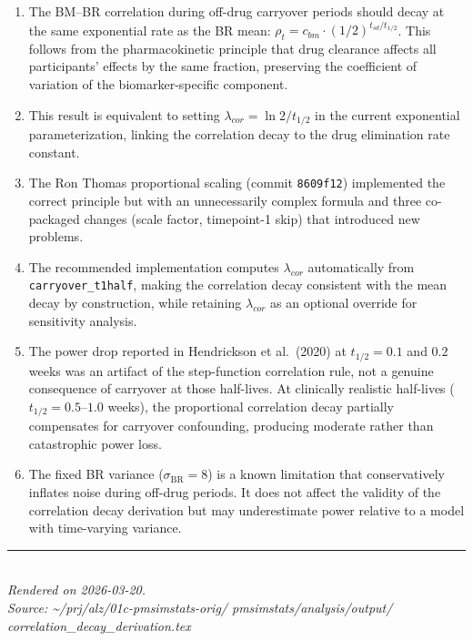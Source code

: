 \documentclass[11pt]{article}
\begin{document}
\begin{enumerate}
\item The BM--BR correlation during off-drug carryover
  periods should decay at the same exponential rate as the
  BR mean: $\rho_t = c_{bm} \cdot (1/2)^{t_{sd}/t_{1/2}}$.
  This follows from the pharmacokinetic principle that drug
  clearance affects all participants' effects by the same
  fraction, preserving the coefficient of variation of the
  biomarker-specific component.

\item This result is equivalent to setting
  $\lambda_{cor} = \ln 2 / t_{1/2}$ in the current
  exponential parameterization, linking the correlation
  decay to the drug elimination rate constant.

\item The Ron Thomas proportional scaling (commit
  \texttt{8609f12}) implemented the correct principle but
  with an unnecessarily complex formula and three
  co-packaged changes (scale factor, timepoint-1 skip)
  that introduced new problems.

\item The recommended implementation computes
  $\lambda_{cor}$ automatically from
  \texttt{carryover\_t1half}, making the correlation decay
  consistent with the mean decay by construction, while
  retaining $\lambda_{cor}$ as an optional override for
  sensitivity analysis.

\item The power drop reported in Hendrickson et al.\ (2020)
  at $t_{1/2} = 0.1$ and $0.2$ weeks was an artifact of the
  step-function correlation rule, not a genuine consequence
  of carryover at those half-lives. At clinically realistic
  half-lives ($t_{1/2} = 0.5$--$1.0$ weeks), the
  proportional correlation decay partially compensates for
  carryover confounding, producing moderate rather than
  catastrophic power loss.

\item The fixed BR variance ($\sigma_{\text{BR}} = 8$) is a
  known limitation that conservatively inflates noise during
  off-drug periods. It does not affect the validity of the
  correlation decay derivation but may underestimate power
  relative to a model with time-varying variance.
\end{enumerate}

\vfill
\noindent\rule{\textwidth}{0.4pt}\\
{\small\textit{Rendered on 2026-03-20.}\\
\textit{Source: \textasciitilde/prj/alz/01c-pmsimstats-orig/%
pmsimstats/analysis/output/%
correlation\_decay\_derivation.tex}}
\end{document}
